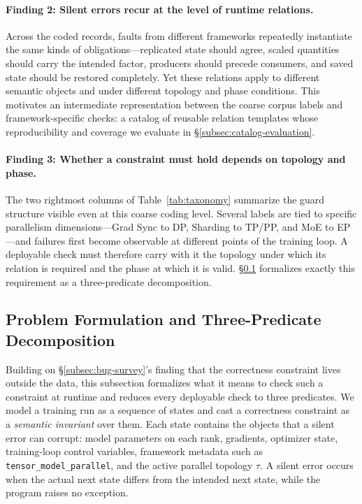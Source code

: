 \documentclass[sigconf,nonacm]{acmart}
\begin{document}
\paragraph{Finding 2: Silent errors recur at the level of runtime relations.}
Across the coded records, faults from different frameworks repeatedly
instantiate the same kinds of obligations---replicated state should agree,
scaled quantities should carry the intended factor, producers should precede
consumers, and saved state should be restored completely. Yet these relations
apply to different semantic objects and under different topology and phase
conditions. This motivates an intermediate representation between the coarse
corpus labels and framework-specific checks: a catalog of reusable relation
templates whose reproducibility and coverage we evaluate in
\S\ref{subsec:catalog-evaluation}.

\paragraph{Finding 3: Whether a constraint must hold depends on topology and phase.} The two rightmost columns of Table~\ref{tab:taxonomy} summarize the guard structure visible even at this coarse coding level. Several labels are tied to specific parallelism dimensions---Grad Sync to DP, Sharding to TP/PP, and MoE to EP---and failures first become observable at different points of the training loop. A deployable check must therefore carry with it the topology under which its relation is required and the phase at which it is valid. \S\ref{subsec:problem-formulation} formalizes exactly this requirement as a three-predicate decomposition.

\subsection{Problem Formulation and Three-Predicate Decomposition}
\label{subsec:problem-formulation}
\label{subsec:three-layer}
\label{subsec:pattern_motivation}

Building on \S\ref{subsec:bug-survey}'s finding that the correctness constraint lives outside the data, this subsection formalizes what it means to check such a constraint at runtime and reduces every deployable check to three predicates. We model a training run as a sequence of states and cast a correctness constraint as a \emph{semantic invariant} over them. Each state contains the objects that a silent error can corrupt: model parameters on each rank, gradients, optimizer state, training-loop control variables, framework metadata such as \texttt{tensor\_model\_parallel}, and the active parallel topology $\tau$. A silent error occurs when the actual next state differs from the intended next state, while the program raises no exception.
\end{document}
